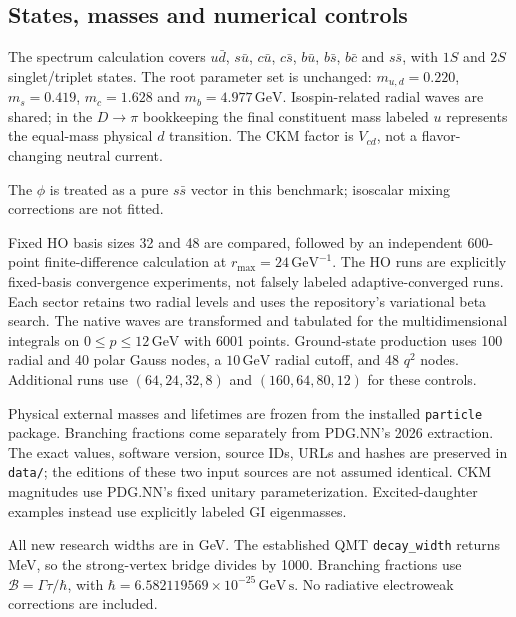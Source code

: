 \documentclass[11pt,a4paper]{article}
\newcommand{\GeV}{\,\mathrm{GeV}}
\newcommand{\BR}{\mathcal B}
\begin{document}
\subsection{States, masses and numerical controls}
The spectrum calculation covers $u\bar d$, $s\bar u$, $c\bar u$, $c\bar s$, $b\bar u$, $b\bar s$, $b\bar c$ and $s\bar s$, with $1S$ and $2S$ singlet/triplet states. The root parameter set is unchanged: $m_{u,d}=0.220$, $m_s=0.419$, $m_c=1.628$ and $m_b=4.977\GeV$. Isospin-related radial waves are shared; in the $D\to\pi$ bookkeeping the final constituent mass labeled $u$ represents the equal-mass physical $d$ transition. The CKM factor is $V_{cd}$, not a flavor-changing neutral current.

The $\phi$ is treated as a pure $s\bar s$ vector in this benchmark; isoscalar mixing corrections are not fitted.

Fixed HO basis sizes 32 and 48 are compared, followed by an independent 600-point finite-difference calculation at $r_{\max}=24\GeV^{-1}$. The HO runs are explicitly fixed-basis convergence experiments, not falsely labeled adaptive-converged runs. Each sector retains two radial levels and uses the repository's variational beta search. The native waves are transformed and tabulated for the multidimensional integrals on $0\leq p\leq12\GeV$ with 6001 points. Ground-state production uses 100 radial and 40 polar Gauss nodes, a $10\GeV$ radial cutoff, and 48 $q^2$ nodes. Additional runs use $(64,24,32,8)$ and $(160,64,80,12)$ for these controls.

Physical external masses and lifetimes are frozen from the installed \texttt{particle} package. Branching fractions come separately from PDG.NN's 2026 extraction. The exact values, software version, source IDs, URLs and hashes are preserved in \texttt{data/}; the editions of these two input sources are not assumed identical. CKM magnitudes use PDG.NN's fixed unitary parameterization. Excited-daughter examples instead use explicitly labeled GI eigenmasses.

All new research widths are in GeV. The established QMT \texttt{decay\_width} returns MeV, so the strong-vertex bridge divides by 1000. Branching fractions use $\BR=\Gamma\tau/\hbar$, with $\hbar=6.582119569\times10^{-25}\GeV\,\mathrm s$. No radiative electroweak corrections are included.
\end{document}

